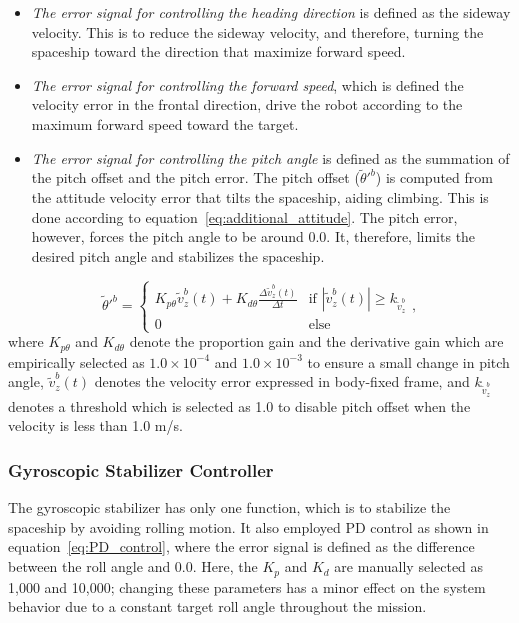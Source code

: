 \begin{itemize}
	\item \textit{The error signal for controlling the heading direction} is defined as the sideway velocity. This is to reduce the sideway velocity, and therefore, turning the spaceship toward the direction that maximize forward speed. 
	\item \textit{The error signal for controlling the forward speed}, which is defined the velocity error in the  frontal direction, drive the robot according to the maximum forward speed toward the target. 
	\item \textit{The error signal for controlling the pitch angle} is defined as the summation of the pitch offset and the pitch error. The pitch offset ($\tilde{\theta}'^b$) is computed from the attitude velocity error that tilts the spaceship, aiding climbing. This is done  according to equation~\ref{eq:additional_attitude}. The pitch error, however, forces the pitch angle to be around 0.0. It, therefore, limits the desired pitch angle and stabilizes the spaceship.
\end{itemize}

\begin{equation}
\tilde{\theta}'^b = 
\begin{cases}
K_{p\theta} \tilde{v}^b_z(t) + K_{d\theta} \frac{\Delta \tilde{v}^b_z(t)}{ \Delta t} & \text{if } |\tilde{v}^b_z(t)| \geq k_{\tilde{v}^b_z} \\
0 & \text{else}
\end{cases},
\label{eq:additional_attitude}
\end{equation}
where $K_{p\theta}$ and $K_{d\theta}$ denote the proportion gain and the derivative gain which are empirically selected as $1.0\times10^{-4}$ and $1.0\times10^{-3}$ to ensure a small change in pitch angle, $\tilde{v}^b_z(t)$ denotes the velocity error expressed in body-fixed frame, and $k_{\tilde{v}^b_z}$ denotes a threshold which is selected as 1.0 to disable pitch offset when the velocity is less than 1.0 m/s.



\subsubsection{Gyroscopic Stabilizer Controller}
The gyroscopic stabilizer has only one function, which is to stabilize the spaceship by avoiding rolling motion. It also employed PD control as shown in equation~\ref{eq:PD_control}, where the error signal is defined as the difference between the roll angle and 0.0. Here, the $K_p$ and $K_d$ are manually selected as 1,000 and 10,000; changing these parameters has a minor effect on the system behavior due to a constant target roll angle throughout the mission.

